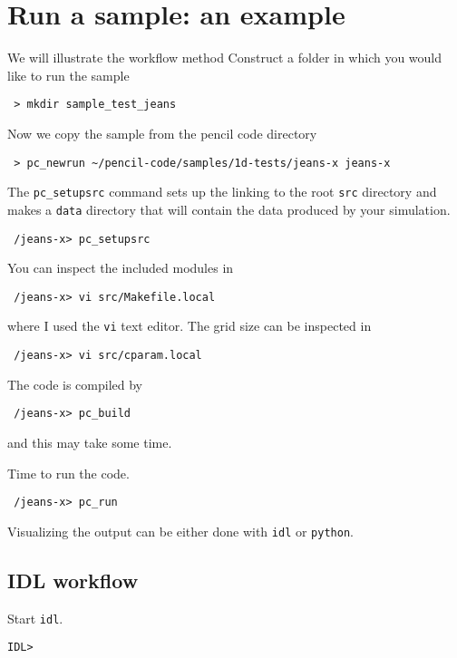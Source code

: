 \documentclass[a4paper,12pt]{article}
\begin{document}
\section{Run a sample: an example}
We will illustrate the workflow method 
Construct a folder in which you would like to run the sample
\begin{verbatim}
 > mkdir sample_test_jeans
\end{verbatim}

Now we copy the sample from the pencil code directory
\begin{verbatim}
 > pc_newrun ~/pencil-code/samples/1d-tests/jeans-x jeans-x
\end{verbatim}

The \verb|pc_setupsrc| command sets up the linking to the root \verb|src|
directory and makes a
\verb|data| directory that will contain the data produced by your simulation.
\begin{verbatim}
 /jeans-x> pc_setupsrc
\end{verbatim}

You can inspect the included modules in
\begin{verbatim}
 /jeans-x> vi src/Makefile.local 
\end{verbatim}
where I used the \verb|vi| text editor. The grid size can be inspected in 
\begin{verbatim}
 /jeans-x> vi src/cparam.local 
\end{verbatim}

The code is compiled by
\begin{verbatim}
 /jeans-x> pc_build
\end{verbatim}
and this may take some time.

Time to run the code. 
\begin{verbatim}
 /jeans-x> pc_run
\end{verbatim}

Visualizing the output can be either done with \verb|idl| or \verb|python|.

\subsection{IDL workflow}
Start \verb|idl|.
\begin{verbatim}
IDL>
\end{verbatim}
\end{document}
